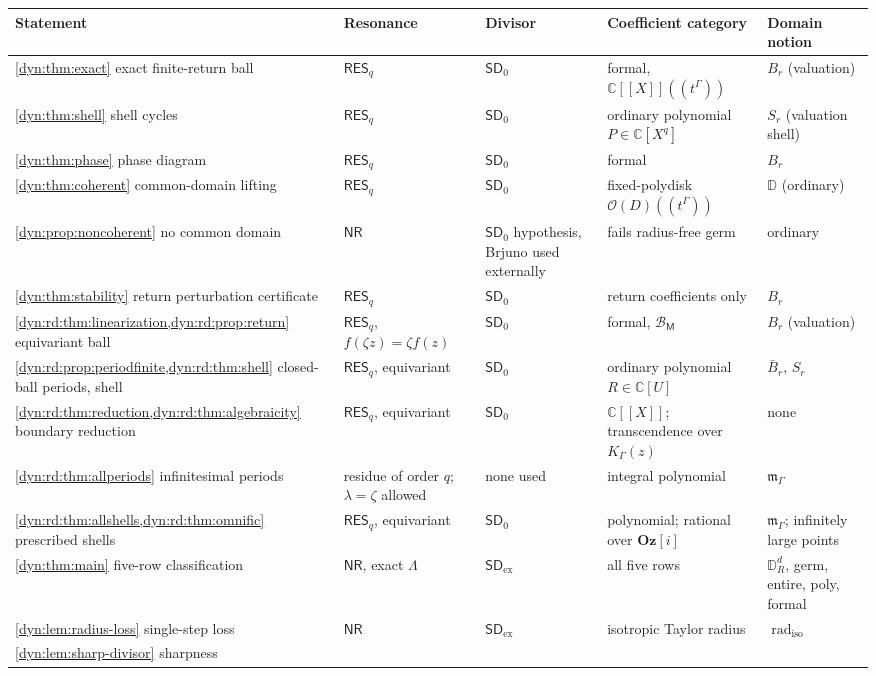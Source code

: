 \documentclass[11pt,letterpaper]{article}
\theoremstyle{definition}
\theoremstyle{remark}
\newcommand{\C}{\mathbb C}
\newcommand{\OO}{\mathcal O}
\newcommand{\BB}{\mathscr B}
\newcommand{\m}{\mathfrak m}
\newcommand{\radiso}{\operatorname{rad}_{\mathrm{iso}}}
\newcommand{\sdz}{\mathsf{SD}_{0}}
\newcommand{\sdex}{\mathsf{SD}_{\mathrm{ex}}}
\newcommand{\resq}{\mathsf{RES}_q}
\newcommand{\nres}{\mathsf{NR}}
\newcommand{\Oz}{\mathbf{Oz}}
\numberwithin{equation}{section}
\begin{document}
\begin{longtable}{@{}P{0.24\textwidth}P{0.10\textwidth}P{0.11\textwidth}P{0.22\textwidth}P{0.20\textwidth}@{}}
\toprule
Statement & Resonance & Divisor & Coefficient category & Domain notion\\
\midrule
\endhead
\cref{dyn:thm:exact} exact finite-return ball
& $\resq$ & $\sdz$ & formal, $\C[[X]]((t^\Gamma))$ & $B_{r}$ (valuation)\\
\cref{dyn:thm:shell} shell cycles
& $\resq$ & $\sdz$ & ordinary polynomial $P\in\C[X^{q}]$ & $S_{r}$ (valuation shell)\\
\cref{dyn:thm:phase} phase diagram
& $\resq$ & $\sdz$ & formal & $B_{r}$\\
\cref{dyn:thm:coherent} common-domain lifting
& $\resq$ & $\sdz$ & fixed-polydisk $\OO(D)((t^\Gamma))$ & $\mathbb D$ (ordinary)\\
\cref{dyn:prop:noncoherent} no common domain
& $\nres$ & $\sdz$ hypothesis, Brjuno used externally & fails radius-free germ & ordinary\\
\cref{dyn:thm:stability} return perturbation certificate
& $\resq$ & $\sdz$ & return coefficients only & $B_{r}$\\
\cref{dyn:rd:thm:linearization,dyn:rd:prop:return} equivariant ball
& $\resq$, $f(\zeta z)=\zeta f(z)$ & $\sdz$ & formal, $\BB_{\mathsf M}$ & $B_{r}$ (valuation)\\
\cref{dyn:rd:prop:periodfinite,dyn:rd:thm:shell} closed-ball periods, shell
& $\resq$, equivariant & $\sdz$ & ordinary polynomial $R\in\C[U]$ & $\bar B_{r}$, $S_{r}$\\
\cref{dyn:rd:thm:reduction,dyn:rd:thm:algebraicity} boundary reduction
& $\resq$, equivariant & $\sdz$ & $\C[[X]]$; transcendence over $K_\Gamma(z)$ & none\\
\cref{dyn:rd:thm:allperiods} infinitesimal periods
& residue of order $q$; $\lambda=\zeta$ allowed & none used & integral polynomial & $\m_\Gamma$\\
\cref{dyn:rd:thm:allshells,dyn:rd:thm:omnific} prescribed shells
& $\resq$, equivariant & $\sdz$ & polynomial; rational over $\Oz[i]$ & $\m_\Gamma$; infinitely large points\\
\cref{dyn:thm:main} five-row classification
& $\nres$, exact $\Lambda$ & $\sdex$ & all five rows & $\mathbb D_R^{d}$, germ, entire, poly, formal\\
\cref{dyn:lem:radius-loss} single-step loss
& $\nres$ & $\sdex$ & isotropic Taylor radius & $\radiso$\\
\cref{dyn:lem:sharp-divisor} sharpness

\end{longtable}
\end{document}
